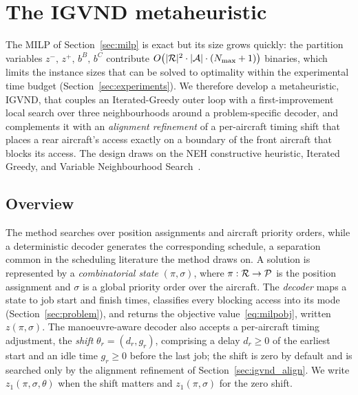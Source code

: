 \section{The IGVND metaheuristic}
\label{sec:heuristic}

The MILP of Section~\ref{sec:milp} is exact but its size grows quickly: the
partition variables $z^-,\,z^+,\,b^B,\,b^C$ contribute
$O\!\left(|\mathcal{R}|^2 \cdot |\mathcal{A}| \cdot (N_{\max}+1)\right)$ binaries,
which limits the instance sizes that can be solved to optimality within
the experimental time budget (Section~\ref{sec:experiments}).  We therefore
develop a metaheuristic, \textsc{IGVND}, that couples an Iterated-Greedy
outer loop with a first-improvement local search over three
neighbourhoods around a problem-specific decoder, and complements it with
an \emph{alignment refinement} of a per-aircraft timing shift that places
a rear aircraft's access exactly on a boundary of the front aircraft that
blocks its access.  The design
draws on the NEH constructive heuristic, Iterated Greedy, and Variable
Neighbourhood Search~\citep{Nawaz1983,Ruiz2007,Hansen2001,Mladenovic1997}.

\subsection{Overview}
\label{sec:igvnd_principle}

The method searches over position assignments and aircraft priority
orders, while a deterministic decoder generates the corresponding
schedule, a separation common in the scheduling literature the method
draws on.  A solution is represented by a \emph{combinatorial state}
$(\pi, \sigma)$, where $\pi : \mathcal{R} \to \mathcal{P}$ is the position assignment
and $\sigma$ is a global priority order over the aircraft.  The
\emph{decoder} maps a state to job start and finish times, classifies
every blocking access into its mode (Section~\ref{sec:problem}), and returns
the objective value~\eqref{eq:milpobj}, written $z(\pi,\sigma)$.  The
manoeuvre-aware decoder also accepts a per-aircraft timing adjustment,
the \emph{shift} $\theta_r = (d_r, g_r)$, comprising a delay $d_r \ge 0$
of the earliest start and an idle time $g_r \ge 0$ before the last job;
the shift is zero by default and is searched only by the alignment
refinement of Section~\ref{sec:igvnd_align}.  We write $z_1(\pi,\sigma,\theta)$
when the shift matters and $z_1(\pi,\sigma)$ for the zero shift.


